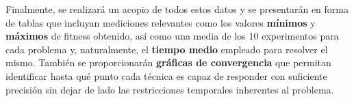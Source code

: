 Finalmente, se realizará un acopio de todos estos datos y se presentarán en forma de tablas que incluyan mediciones relevantes como los valores \textbf{mínimos} y \textbf{máximos} de fitness obtenido, así como una media de los 10 experimentos para cada problema y, naturalmente, el \textbf{tiempo medio} empleado para resolver el mismo. También se proporcionarán \textbf{gráficas de convergencia} que permitan identificar hasta qué punto cada técnica es capaz de responder con suficiente precisión sin dejar de lado las restricciones temporales inherentes al problema.






